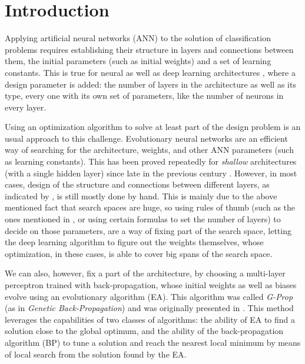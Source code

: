\documentclass[conference]{IEEEtran}\usepackage[]{graphicx}\usepackage[]{color}
\begin{document}
\section{Introduction}

Applying artificial neural networks (ANN) to the solution of
classification problems requires establishing their structure in
layers and connections between them, the initial parameters (such as
initial weights) and a set of learning constants. This is true for
neural as well as deep learning architectures
\cite{goodfellow,nielsen}, where a design parameter is added: the
number of layers in the architecture as well as its type, every one
with its own set of parameters, like the number of neurons in every
layer.

Using an optimization algorithm to solve at least part of the design problem
is an usual approach to this challenge. Evolutionary neural networks are an efficient way of searching for the
architecture, weights, and other ANN parameters (such as learning
constants). This has been proved
repeatedly for {\em shallow} architectures (with a single hidden
layer) since late in the previous century
\cite{yao1993evolutionary,CastilloNPL,stanley2002evolving}. However, in most cases, design
of the structure and connections between different layers, as
indicated by \cite{miikkulainen2019evolving}, is still mostly done by
hand. This is mainly due to the above mentioned fact that search
spaces are huge, so using rules of thumb (such as the ones mentioned
in \cite{qolomany2017parameters}, or using certain formulas to set the
number of layers) to decide on those parameters,
are a way of fixing part of the search space, letting the deep
learning algorithm to figure out the weights themselves, whose
optimization, in these cases, is able to cover big spans of the search
space.

We can also, however, fix a part of the architecture, by choosing a
multi-layer perceptron trained with back-propagation, whose initial
weights as well as biases evolve using an evolutionary algorithm (EA). This
algorithm was called \emph{G-Prop} (as in \emph{Genetic Back-Propagation})
and was originally presented in \cite{castilloNC,CastilloNPL}. This
method leverages the capabilities of two classes of algorithms: the
ability of EA to find a solution close to the global optimum, and the
ability of the back-propagation algorithm (BP) \cite{Rumelhart86} to tune a solution and
reach the nearest local minimum by means of local search from the
solution found by the EA.
\end{document}
